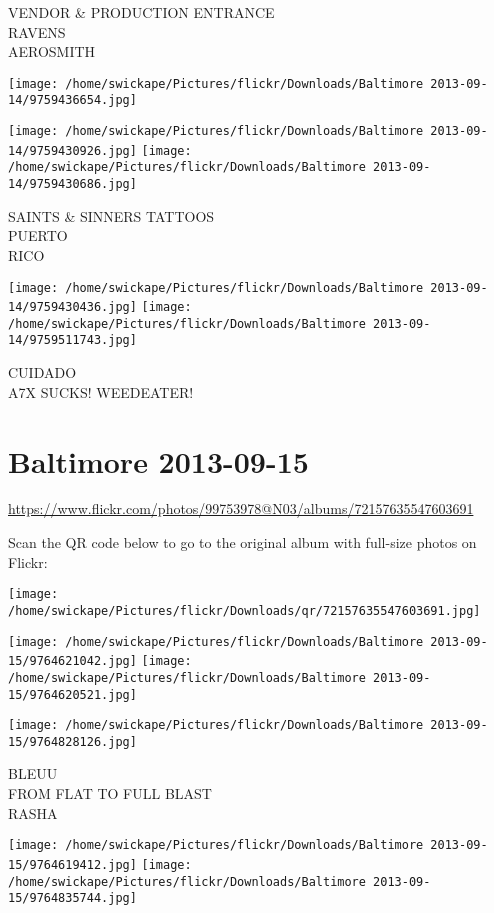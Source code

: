 \documentclass[10pt,letterpaper]{article}
\begin{document}
VENDOR \& PRODUCTION ENTRANCE\\
RAVENS\\
AEROSMITH
\pagebreak

\texttt{[image: /home/swickape/Pictures/flickr/Downloads/Baltimore 2013-09-14/9759436654.jpg]}

\vspace{0.25in}
\texttt{[image: /home/swickape/Pictures/flickr/Downloads/Baltimore 2013-09-14/9759430926.jpg]}
\texttt{[image: /home/swickape/Pictures/flickr/Downloads/Baltimore 2013-09-14/9759430686.jpg]}

SAINTS \& SINNERS TATTOOS\\
PUERTO\\
RICO
\pagebreak

\texttt{[image: /home/swickape/Pictures/flickr/Downloads/Baltimore 2013-09-14/9759430436.jpg]}
\texttt{[image: /home/swickape/Pictures/flickr/Downloads/Baltimore 2013-09-14/9759511743.jpg]}

CUIDADO\\
A7X SUCKS!  WEEDEATER!
\pagebreak

\section*{Baltimore 2013-09-15}

\url{https://www.flickr.com/photos/99753978@N03/albums/72157635547603691}

Scan the QR code below to go to the original album with full-size photos on Flickr:

\texttt{[image: /home/swickape/Pictures/flickr/Downloads/qr/72157635547603691.jpg]}
\pagebreak

\texttt{[image: /home/swickape/Pictures/flickr/Downloads/Baltimore 2013-09-15/9764621042.jpg]}
\texttt{[image: /home/swickape/Pictures/flickr/Downloads/Baltimore 2013-09-15/9764620521.jpg]}

\vspace{0.25in}
\texttt{[image: /home/swickape/Pictures/flickr/Downloads/Baltimore 2013-09-15/9764828126.jpg]}

BLEUU\\
FROM FLAT TO FULL BLAST\\
RASHA
\pagebreak

\texttt{[image: /home/swickape/Pictures/flickr/Downloads/Baltimore 2013-09-15/9764619412.jpg]}
\texttt{[image: /home/swickape/Pictures/flickr/Downloads/Baltimore 2013-09-15/9764835744.jpg]}
\end{document}

